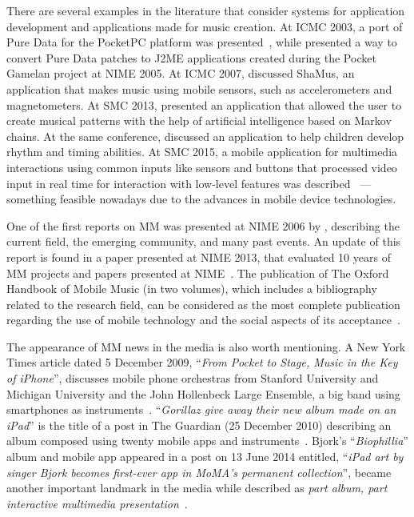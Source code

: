 There are several examples in the literature that consider systems for application development and applications made for music creation.
At ICMC 2003, a port of Pure Data for the PocketPC platform was presented~\citep{Geiger2003pda}, while
\cite{Schiemer2005pocketgamelan} presented a way to convert Pure Data patches to J2ME applications created during the Pocket Gamelan project at NIME 2005.
At ICMC 2007, \cite{Essl2007shamus} discussed ShaMus, an application that makes music using mobile sensors, such as accelerometers and magnetometers.
At SMC 2013, \cite{Ekeus2013predictable} presented an application that allowed the user to create musical patterns with the help of artificial intelligence based on Markov chains.
At the same conference, \cite{Baldan2013melody} discussed an application to help children develop rhythm and timing abilities.
At SMC 2015, a mobile application for multimedia interactions using common inputs like sensors and buttons that processed video input in real time for interaction with low-level features was described~\citep{Krekovic2015sound} --- something feasible nowadays due to the advances in mobile device technologies.

One of the first reports on MM was presented at NIME 2006 by \cite{Gaye2006report}, describing the current field, the emerging community, and many past events.
An update of this report is found in a paper presented at NIME 2013, that evaluated 10 years of MM projects and papers presented at NIME~\citep{John2013updating}.
The publication of The Oxford Handbook of Mobile Music (in two volumes), which includes a bibliography related to the research field, can be considered as the most complete publication regarding the use of mobile technology and the social aspects of its acceptance~\citep{Gopinath2014handbookmobilemusicstudies1,Gopinath2014handbookmobilemusicstudies2}.

The appearance of MM news in the media is also worth mentioning.
A New York Times article dated 5 December 2009, ``\textit{From Pocket to Stage, Music in the Key of iPhone}'', discusses mobile phone orchestras from Stanford University and Michigan University and the John Hollenbeck Large Ensemble, a big band using smartphones as instruments~\citep{Miller2009nytimes}.
``\textit{Gorillaz give away their new album made on an iPad}'' is the title of a post in The Guardian (25 December 2010) describing an album composed using twenty mobile apps and instruments~\citep{Smith2010gorillaz}.
Bjork's ``\textit{Biophillia}'' album and mobile app appeared in a post on 13 June 2014 entitled, ``\textit{iPad art by singer Bjork becomes first-ever app in MoMA's permanent collection}'', became another important landmark in the media while described as \textit{part album, part interactive multimedia presentation}~\citep{Hughes2014bjork}.

